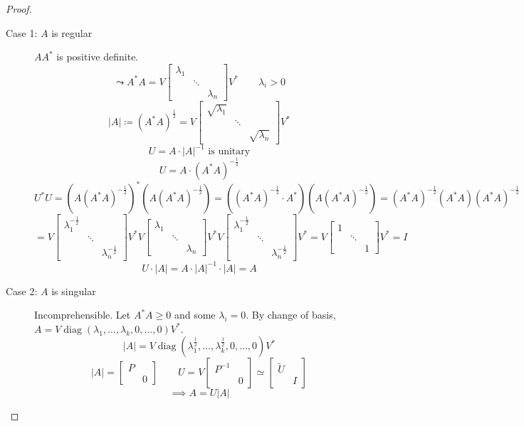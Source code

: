 \documentclass{article}
\numberwithin{lecref}{section}
\newcommand{\card}[1]{\left|#1\right|}
\begin{document}
\begin{proof}
  \begin{description}
    \item[Case 1: $A$ is regular]
      $A A^*$ is positive definite.
      \[ \leadsto A^* A = V \begin{bmatrix} \lambda_1 & &  \\ & \ddots & \\ & & \lambda_n \end{bmatrix} V^* \qquad \lambda_i > 0 \]
      \[ \card{A} \coloneqq (A^* A)^{\frac12} = V \begin{bmatrix} \sqrt{\lambda_1} & &  \\ & \ddots & \\ & & \sqrt{\lambda_n} \end{bmatrix} V^* \]
      \[ U = A \cdot \card{A}^{-1} \text{ is unitary} \]
      \[ U = A \cdot (A^* A)^{-\frac12} \]
      \[ U^* U = (A(A^* A)^{-\frac12})^* (A (A^* A)^{-\frac12}) = ((A^* A)^{-\frac12} \cdot A^*) (A (A^* A)^{-\frac12}) = (A^* A)^{-\frac12} (A^* A) (A^* A)^{-\frac12} \]
      \[ = V \begin{bmatrix} \lambda_1^{-\frac12} & & \\ & \ddots & \\ & & \lambda_n^{-\frac12} \end{bmatrix} V^* V \begin{bmatrix} \lambda_1 & & \\ & \ddots & \\ & & \lambda_n \end{bmatrix} V^* V \begin{bmatrix} \lambda_1^{-\frac12} & & \\ & \ddots & \\ & & \lambda_n^{-\frac12} \end{bmatrix} V^* = V \begin{bmatrix} 1 & & \\ & \ddots & \\ & & 1 \end{bmatrix} V^* = I \]
      \[ U \cdot \card{A} = A \cdot \card{A}^{-1} \cdot \card{A} = A \]
    \item[Case 2: $A$ is singular] Incomprehensible.
      Let $A^* A \geq 0$ and some $\lambda_i = 0$.
      By change of basis, $A = V \operatorname{diag}(\lambda_1, \dots, \lambda_k, 0, \dots, 0) V^*$.
      \[ \card{A} = V \operatorname{diag}(\lambda_1^{\frac12}, \dots, \lambda_k^{\frac12}, 0, \dots, 0) V^* \]
      \[ \card{A} = \begin{bmatrix} P & \\ & 0 \end{bmatrix} \qquad U = V \begin{bmatrix} P^{-1} & \\ & 0 \end{bmatrix} \simeq \begin{bmatrix} \tilde U & \\ & I \end{bmatrix} \]
      \[ \implies A = U \card{A} \]
  \end{description}
\end{proof}
\end{document}
